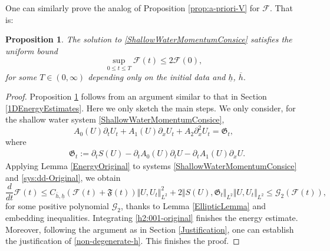\documentclass[reqno,11pt]{amsart}
\newcommand{\norm}[2]{\Vert #1 \Vert_{#2}}
\theoremstyle{plain}
\newtheorem{proposition}[theorem]{Proposition}
\theoremstyle{definition}
\numberwithin{equation}{section}
\begin{document}
\smallskip 

One can similarly prove the analog of Proposition \ref{prop:a-priori-V} for $\mathcal{F}.$ That is:
\begin{proposition}
    \label{apriori-Original}
    The solution to \eqref{ShallowWaterMomentumConsice} satisfies the uniform bound
    \[
    \sup_{0\leq t\leq {T}} \mathcal{F}(t)\leq 2 \mathcal{F}(0),
    \]
    for some $T\in (0,\infty)$ depending only on the initial data and $\underline h$, $\overline{ h}.$
\end{proposition}

\begin{proof}
    Proposition \ref{apriori-Original} follows from an argument similar to that in Section \ref{1DEnergyEstimates}. Here we only sketch the main steps. We only consider, for the shallow water system \eqref{ShallowWaterMomentumConsice}, 
    \begin{equation}
    \label{sys:dd-Original}
    A_0(U)\partial_t U_t+A_1(U)\partial_x U_t+A_2\partial_{x}^2 U_t=\mathfrak G_t,
    \end{equation}
    where 
    \begin{align*}
        & \mathfrak G_t:=\partial_t S(U)-\partial_t A_0(U) \partial_t U-\partial_t A_1(U)\partial_x U.
    \end{align*}
    Applying Lemma \ref{EnergyOriginal} to systems \eqref{ShallowWaterMomentumConsice} and \eqref{sys:dd-Original}, we obtain
\begin{equation}
    \label{h2:001-original}
    \frac{d}{dt} \mathcal F(t) \leq C_{\overline {h},\underline{h}} (\mathcal{F}(t) + \mathfrak F(t)) \norm{U,U_{t}}{L^2}^2 +2\norm{{S(U)},\mathfrak{G}_{t}}{L^2}\norm{U,U_{t}}{L^2} \leq \mathcal G_2(\mathcal F(t)),
\end{equation}
for some positive polynomial $ \mathcal G_2 $, thanks to Lemma \ref{EllipticLemma} and embedding inequalities. Integrating \eqref{h2:001-original} finishes the energy estimate. Moreover, following the argument as in Section \ref{Justification}, one can establish the justification of \eqref{non-degenerate-h}. This finishes the proof. 
\end{proof}
\end{document}

